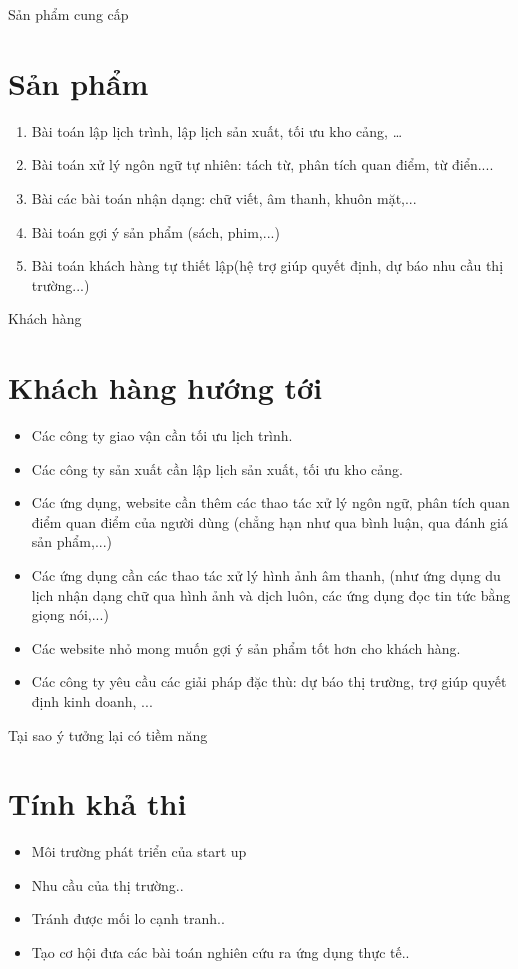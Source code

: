 \documentclass{beamer}
\begin{document}
\begin{frame}{Sản phẩm cung cấp}
\section{Sản phẩm}
\begin{enumerate}
\item Bài toán lập lịch trình, lập lịch sản xuất, tối ưu kho cảng, …

\item Bài toán xử lý ngôn ngữ tự nhiên: tách từ, phân tích quan điểm, từ điển....

\item Bài các bài toán nhận dạng: chữ viết, âm thanh, khuôn mặt,...
\item Bài toán gợi ý sản phẩm (sách, phim,...)
\item Bài toán khách hàng tự thiết lập(hệ trợ giúp quyết định, dự báo nhu cầu thị trường...)
\end{enumerate}
\end{frame}
\begin{frame}{Khách hàng}
\section{Khách hàng hướng tới}
\begin{itemize}
\item Các công ty giao vận cần tối ưu lịch trình.
\item Các công ty sản xuất cần lập lịch sản xuất, tối ưu kho cảng.
\item Các ứng dụng, website cần thêm các thao tác xử lý ngôn ngữ, phân tích quan điểm quan điểm của người dùng (chẳng hạn như qua bình luận, qua đánh giá sản phẩm,...)
\item Các ứng dụng cần các thao tác xử lý hình ảnh âm thanh, (như ứng dụng du lịch nhận dạng chữ qua hình ảnh và dịch luôn, các ứng dụng đọc tin tức bằng giọng nói,...)
\item Các website nhỏ mong muốn gợi ý sản phẩm tốt hơn cho khách hàng.
\item Các công ty yêu cầu các giải pháp đặc thù: dự báo thị trường, trợ giúp quyết định kinh doanh, ... 

\end{itemize}
\end{frame}
\begin{frame}{Tại sao ý tưởng lại có tiềm năng}
\section{Tính khả thi }
\begin{itemize}
\item Môi trường phát triển của start up
\item Nhu cầu của thị trường..
\item Tránh được mối lo cạnh tranh..
\item Tạo cơ hội đưa các bài toán nghiên cứu ra ứng dụng thực tế..
\end{itemize} 
\end{frame}
\end{document}
